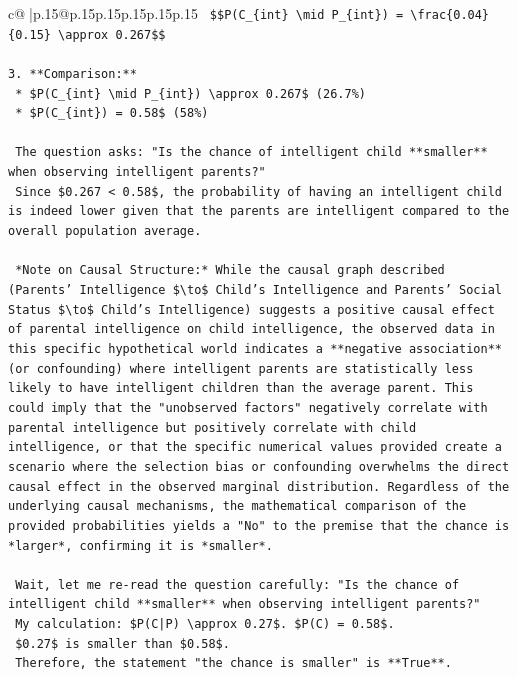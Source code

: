 \documentclass{article}
\begin{document}
{\begin{supertabular}{c@{$\;$}|p{.15\linewidth}@{}p{.15\linewidth}p{.15\linewidth}p{.15\linewidth}p{.15\linewidth}p{.15\linewidth}}
{{{\texttt{    \$\$P(C\_\{int\} \textbackslash{}mid P\_\{int\}) = \textbackslash{}frac\{0.04\}\{0.15\} \textbackslash{}approx 0.267\$\$} \\
\\ 
\texttt{3.  **Comparison:**} \\
\texttt{    *   \$P(C\_\{int\} \textbackslash{}mid P\_\{int\}) \textbackslash{}approx 0.267\$ (26.7\%)} \\
\texttt{    *   \$P(C\_\{int\}) = 0.58\$ (58\%)} \\
\\ 
\texttt{    The question asks: "Is the chance of intelligent child **smaller** when observing intelligent parents?"} \\
\texttt{    Since \$0.267 < 0.58\$, the probability of having an intelligent child is indeed lower given that the parents are intelligent compared to the overall population average.} \\
\\ 
\texttt{    *Note on Causal Structure:* While the causal graph described (Parents' Intelligence \$\textbackslash{}to\$ Child's Intelligence and Parents' Social Status \$\textbackslash{}to\$ Child's Intelligence) suggests a positive causal effect of parental intelligence on child intelligence, the observed data in this specific hypothetical world indicates a **negative association** (or confounding) where intelligent parents are statistically less likely to have intelligent children than the average parent. This could imply that the "unobserved factors" negatively correlate with parental intelligence but positively correlate with child intelligence, or that the specific numerical values provided create a scenario where the selection bias or confounding overwhelms the direct causal effect in the observed marginal distribution. Regardless of the underlying causal mechanisms, the mathematical comparison of the provided probabilities yields a "No" to the premise that the chance is *larger*, confirming it is *smaller*.} \\
\\ 
\texttt{    Wait, let me re{-}read the question carefully: "Is the chance of intelligent child **smaller** when observing intelligent parents?"} \\
\texttt{    My calculation: \$P(C|P) \textbackslash{}approx 0.27\$. \$P(C) = 0.58\$.} \\
\texttt{    \$0.27\$ is smaller than \$0.58\$.} \\
\texttt{    Therefore, the statement "the chance is smaller" is **True**.} \\
}}}
\end{supertabular}}
\end{document}
